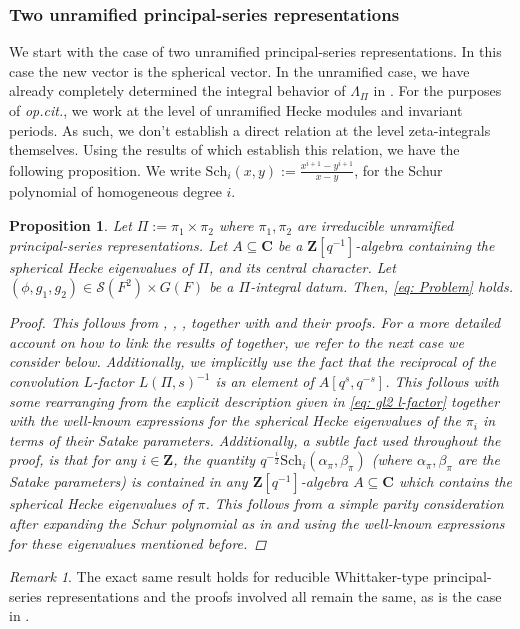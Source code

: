 \documentclass{amsart}
\theoremstyle{plain}
\newtheorem{prop}[thm]{Proposition}
\theoremstyle{plain}
\theoremstyle{remark}
\newtheorem{rem}[thm]{Remark}
\begin{document}
\subsubsection{Two unramified principal-series representations}
We start with the case of two unramified principal-series representations. In this case the new vector is the spherical vector. In the unramified case, we have already completely determined the integral behavior of $\Lambda_\Pi$ in \cite[\S $3$]{groutides2024rankinselbergintegralstructureseuler}. For the purposes of \textit{op.cit.}, we work at the level of unramified Hecke modules and invariant periods. As such, we don't establish a direct relation at the level zeta-integrals themselves. Using the results of  which establish this relation, we have the following proposition. We write $\mathrm{Sch}_i(x,y):=\frac{x^{i+1}-y^{i+1}}{x-y}$, for the Schur polynomial of homogeneous degree $i$. 
\begin{prop}
    Let $\Pi:=\pi_1\times \pi_2$ where $\pi_1,\pi_2$ are irreducible unramified principal-series representations. Let $A\subseteq\mathbf{C}$ be a $\mathbf{Z}[q^{-1}]$-algebra containing the spherical Hecke eigenvalues of $\Pi$, and its central character. Let $(\phi,g_1,g_2)\in\mathcal{S}(F^2)\times G(F)$ be a $\Pi$-integral datum. Then, \eqref{eq: Problem} holds.
    \begin{proof}
        This follows from , , , together with \cite[Lemma $4.3.6$ \& Lemma $4.3.7$]{groutides2024rankinselbergintegralstructureseuler} and their proofs. For a more detailed account on how to link the results of  together, we refer to the next case we consider below. Additionally, we implicitly use the fact that the reciprocal of the convolution $L$-factor $L(\Pi,s)^{-1}$ is an element of $A[q^s,q^{-s}]$. This follows with some rearranging from the explicit description given in \eqref{eq: gl2 l-factor} together with the well-known expressions for the spherical Hecke eigenvalues of the $\pi_i$ in terms of their Satake parameters. Additionally, a subtle fact used throughout the proof, is that for any $i\in\mathbf{Z}$, the quantity  $q^{-\tfrac{i}{2}}\mathrm{Sch}_i(\alpha_\pi,\beta_\pi)$ (where $\alpha_\pi,\beta_\pi$ are the Satake parameters) is contained in any $\mathbf{Z}[q^{-1}]$-algebra $A\subseteq \mathbf{C}$ which contains the spherical Hecke eigenvalues of $\pi$. This follows from a simple parity consideration after expanding the Schur polynomial as in \cite[\S $6.3.1$]{groutides2024integral} and using the well-known expressions for these eigenvalues mentioned before.
    \end{proof}
\end{prop}
\begin{rem}
    The exact same result holds for reducible Whittaker-type principal-series representations and the proofs involved all remain the same, as is the case in \cite{groutides2024rankinselbergintegralstructureseuler}.
\end{rem}
\end{document}
